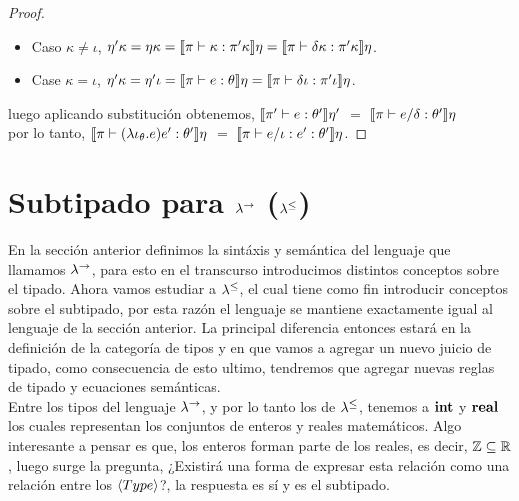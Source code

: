 \begin{proof}
\begin{itemize}
\item Caso $\kappa \neq \iota$, $\eta' \kappa = \eta \kappa = 
									\llbracket \pi \vdash \kappa : \pi'\kappa \rrbracket\eta = 
									\llbracket \pi \vdash \delta \kappa : \pi'\kappa \rrbracket\eta$.

\item Case $\kappa = \iota$, $\eta' \kappa = \eta' \iota = 
									 \llbracket \pi \vdash e : \theta \rrbracket\eta = 
									 \llbracket \pi \vdash \delta \iota : \pi'\iota \rrbracket\eta$.
\end{itemize}

luego aplicando substituci\'on obtenemos,
$\llbracket \pi' \vdash e : \theta' \rrbracket\eta'$ $=$ $\llbracket \pi \vdash e / \delta : \theta' \rrbracket\eta$\\

por lo tanto, $\llbracket \pi \vdash (\lambda \iota_{\theta} . e)e' : \theta' \rrbracket\eta$ $=$
 			  $\llbracket \pi \vdash e / \iota:e' : \theta' \rrbracket\eta$.

\end{proof}

\section{Subtipado para $\lambda^{\rightarrow}$ ($\lambda^{\leq}$)}

En la secci\'on anterior definimos la sint\'axis y sem\'antica del lenguaje que llamamos
$\lambda^{\rightarrow}$, para esto en el transcurso introducimos distintos conceptos sobre el tipado.
Ahora vamos estudiar a $\lambda^{\leq}$, el cual tiene como fin introducir conceptos sobre
el subtipado, por esta raz\'on el lenguaje se mantiene exactamente igual al lenguaje 
de la secci\'on anterior. La principal diferencia entonces estar\'a en la definici\'on
de la categor\'ia de tipos y en que vamos a agregar un nuevo juicio de tipado, como
consecuencia de esto ultimo, tendremos que agregar nuevas reglas de tipado y ecuaciones 
sem\'anticas.\\

Entre los tipos del lenguaje $\lambda^{\rightarrow}$, y por lo tanto los de $\lambda^{\leq}$, tenemos
a $\textbf{int}$ y $\textbf{real}$ los cuales representan los conjuntos de enteros y reales matem\'aticos.
Algo interesante a pensar es que, los enteros forman parte de los reales, es decir,
$\mathbb{Z} \subseteq \mathbb{R}$, luego surge la pregunta, ¿Existir\'a una forma de expresar esta relaci\'on 
como una relaci\'on entre los $\langle Type \rangle$?, la respuesta es s\'i y es el subtipado.\\

